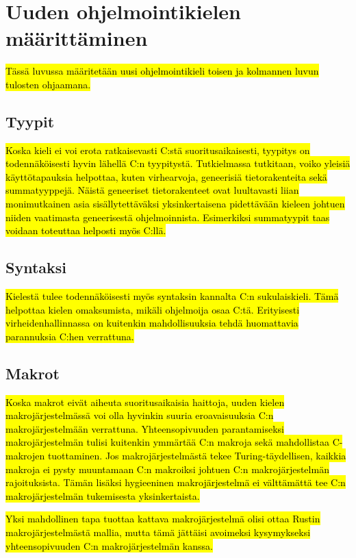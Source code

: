 \section{Uuden ohjelmointikielen määrittäminen}

\hl{Tässä luvussa määritetään uusi ohjelmointikieli toisen ja kolmannen luvun
tulosten ohjaamana.}

\subsection{Tyypit}

\hl{Koska kieli ei voi erota ratkaisevasti C:stä suoritusaikaisesti, tyypitys
on todennäköisesti hyvin lähellä C:n tyypitystä. Tutkielmassa tutkitaan, voiko
yleisiä käyttötapauksia helpottaa, kuten virhearvoja, geneerisiä
tietorakenteita sekä summatyyppejä. Näistä geneeriset tietorakenteet ovat
luultavasti liian monimutkainen asia sisällytettäväksi yksinkertaisena
pidettävään kieleen johtuen niiden vaatimasta geneerisestä ohjelmoinnista.
Esimerkiksi summatyypit taas voidaan toteuttaa helposti myös C:llä.}

\subsection{Syntaksi}

\hl{Kielestä tulee todennäköisesti myös syntaksin kannalta C:n sukulaiskieli.
Tämä helpottaa kielen omaksumista, mikäli ohjelmoija osaa C:tä. Erityisesti
virheidenhallinnassa on kuitenkin mahdollisuuksia tehdä huomattavia parannuksia
C:hen verrattuna.}

\subsection{Makrot}

\hl{Koska makrot eivät aiheuta suoritusaikaisia haittoja, uuden kielen
makrojärjestelmässä voi olla hyvinkin suuria eroavaisuuksia C:n
makrojärjestelmään verrattuna. Yhteensopivuuden parantamiseksi
makrojärjestelmän tulisi kuitenkin ymmärtää C:n makroja sekä mahdollistaa
C-makrojen tuottaminen. Jos makrojärjestelmästä tekee Turing-täydellisen,
kaikkia makroja ei pysty muuntamaan C:n makroiksi johtuen C:n makrojärjestelmän
rajoituksista. Tämän lisäksi hygieeninen makrojärjestelmä ei välttämättä tee
C:n makrojärjestelmän tukemisesta yksinkertaista.}

\hl{Yksi mahdollinen tapa tuottaa kattava makrojärjestelmä olisi ottaa Rustin
makrojärjestelmästä mallia, mutta tämä jättäisi avoimeksi kysymykseksi
yhteensopivuuden C:n makrojärjestelmän kanssa.}


